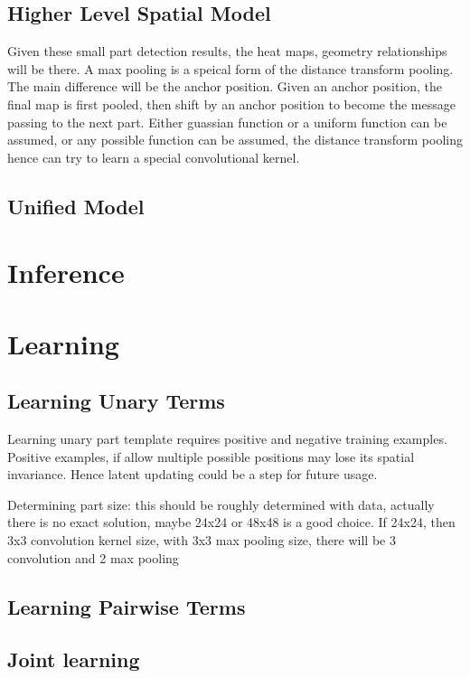\documentclass[10pt,twocolumn,letterpaper]{article}
\begin{document}
\subsection{Higher Level Spatial Model}
Given these small part detection results, the heat maps, geometry relationships will be there. A max pooling is a speical form of the distance transform pooling. The main difference will be the anchor position. Given an anchor position, the final map is first pooled, then shift by an anchor position to become the message passing to the next part. Either guassian function or a uniform function can be assumed, or any possible function can be assumed, the distance transform pooling hence can try to learn a special convolutional kernel.  

\subsection{Unified Model}

\section{Inference}

\section{Learning}

\subsection{Learning Unary Terms}

Learning unary part template requires positive and negative training examples. Positive examples, if allow multiple possible positions may lose its spatial invariance. Hence latent updating could be a step for future usage. 

Determining part size: this should be roughly determined with data, actually there is no exact solution, maybe 24x24 or 48x48 is a good choice. If 24x24, then 3x3 convolution kernel size, with 3x3 max pooling size, there will be 3 convolution and 2 max pooling 

\subsection{Learning Pairwise Terms}

\subsection{Joint learning}
\end{document}
